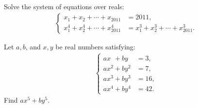 \begin{question}[name={2011 Ecuador TST}]
    Solve the system of equations over reals:
    \begin{align*}
        \begin{cases}
            x_1+x_2+\cdots+x_{2011} &= 2011,\\ x_1^4+x_2^4+\cdots+x_{2011}^4 & = x_1^3+x_2^3+\cdots+x_{2011}^3.
        \end{cases}
    \end{align*}
\end{question}



\begin{question}[name={2016 Ecuador}]
    Let $a,b$, and $x,y$ be real numbers satisfying:
    \begin{align*}
        \begin{cases}
            ax\phantom{^1} + by\phantom{^1} &= 3,\\
            ax^2 + by^2 &= 7,\\
            ax^3 + by^3 &= 16,\\
            ax^4 + by^4 &= 42.
        \end{cases}
    \end{align*}
    Find $ax^5+by^5$.
\end{question}






